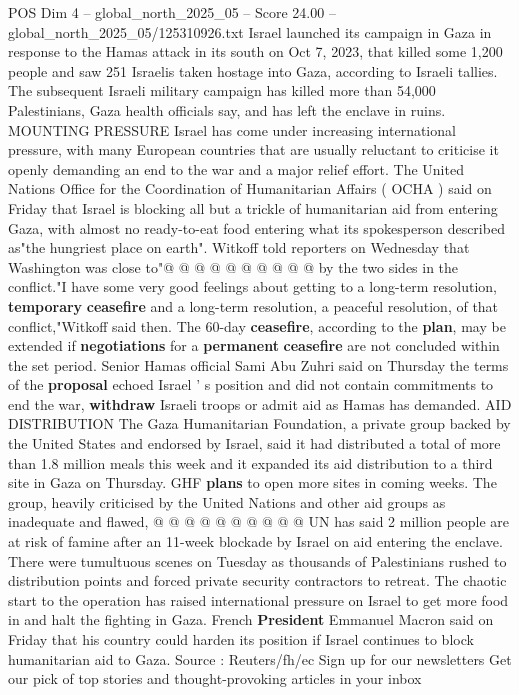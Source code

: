 \begin{textsample}{POS Dim 4 – global\_north\_2025\_05 – Score 24.00 – global\_north\_2025\_05/125310926.txt}
Israel launched its campaign in Gaza in response to the Hamas attack in its south on Oct 7, 2023, that killed some 1,200 people and saw 251 Israelis taken hostage into Gaza, according to Israeli tallies.
The subsequent Israeli military campaign has killed more than 54,000 Palestinians, Gaza health officials say, and has left the enclave in ruins.
MOUNTING PRESSURE Israel has come under increasing international pressure, with many European countries that are usually reluctant to criticise it openly demanding an end to the war and a major relief effort.
The United Nations Office for the Coordination of Humanitarian Affairs ( OCHA ) said on Friday that Israel is blocking all but a trickle of humanitarian aid from entering Gaza, with almost no ready-to-eat food entering what its spokesperson described as"the hungriest place on earth".
Witkoff told reporters on Wednesday that Washington was close to"@ @ @ @ @ @ @ @ @ @ by the two sides in the conflict."I have some very good feelings about getting to a long-term resolution, \textbf{temporary} \textbf{ceasefire} and a long-term resolution, a peaceful resolution, of that conflict,"Witkoff said then.
The 60-day \textbf{ceasefire}, according to the \textbf{plan}, may be extended if \textbf{negotiations} for a \textbf{permanent} \textbf{ceasefire} are not concluded within the set period.
Senior Hamas official Sami Abu Zuhri said on Thursday the terms of the \textbf{proposal} echoed Israel ' s position and did not contain commitments to end the war, \textbf{withdraw} Israeli troops or admit aid as Hamas has demanded.
AID DISTRIBUTION The Gaza Humanitarian Foundation, a private group backed by the United States and endorsed by Israel, said it had distributed a total of more than 1.8 million meals this week and it expanded its aid distribution to a third site in Gaza on Thursday.
GHF \textbf{plans} to open more sites in coming weeks.
The group, heavily criticised by the United Nations and other aid groups as inadequate and flawed, @ @ @ @ @ @ @ @ @ @ UN has said 2 million people are at risk of famine after an 11-week blockade by Israel on aid entering the enclave.
There were tumultuous scenes on Tuesday as thousands of Palestinians rushed to distribution points and forced private security contractors to retreat.
The chaotic start to the operation has raised international pressure on Israel to get more food in and halt the fighting in Gaza.
French \textbf{President} Emmanuel Macron said on Friday that his country could harden its position if Israel continues to block humanitarian aid to Gaza.
Source : Reuters/fh/ec Sign up for our newsletters Get our pick of top stories and thought-provoking articles in your inbox

\end{textsample}
